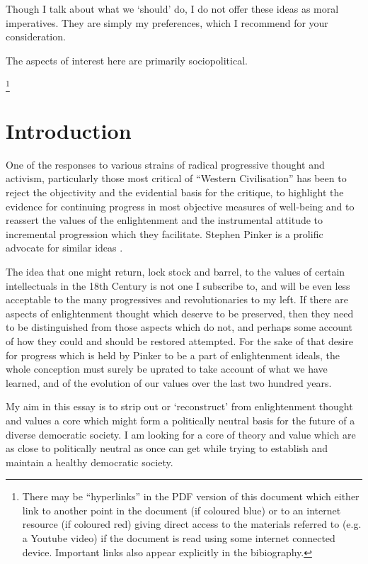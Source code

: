 \documentclass[10pt,titlepage]{article}
\begin{document}
Though I talk about what we `should' do, I do not offer these ideas as moral imperatives.
They are simply my preferences, which I recommend for your consideration.


The aspects of interest here are primarily sociopolitical.


\footnote{There may be ``hyperlinks'' in the PDF version of this document which either link to another point in the document  (if coloured blue) or to an internet resource  (if coloured red) giving direct access to the materials referred to (e.g. a Youtube video) if the document is read using some internet connected device.
Important links also appear explicitly in the bibiography.}

\section{Introduction}

One of the responses to various strains of radical progressive thought and activism, particularly those most critical of ``Western Civilisation'' has been to reject the objectivity and the evidential basis for the critique, to highlight the evidence for continuing progress in most objective measures of well-being and to reassert the values of the enlightenment and the instrumental attitude to incremental progression which they facilitate.
Stephen Pinker is a prolific advocate for similar ideas \cite{pinker-angels,pinker-en}.

The idea that one might return, lock stock and barrel, to the values of certain intellectuals in the 18th Century is not one I subscribe to, and will be even less acceptable to the many progressives and revolutionaries to my left.
If there are aspects of enlightenment thought which deserve to be preserved, then they need to be distinguished from those aspects which do not, and perhaps some account of how they could and should be restored attempted.
For the sake of that desire for progress which is held by Pinker to be a part of enlightenment ideals, the whole conception must surely be uprated to take account of what we have learned, and of the evolution of our values over the last two hundred years.

My aim in this essay is to strip out or `reconstruct' from enlightenment thought and values a core which might form a politically neutral basis for the future of a diverse democratic society.
I am looking for a core of theory and value which are as close to politically neutral as once can get while trying to establish and maintain a healthy democratic society.
\end{document}
